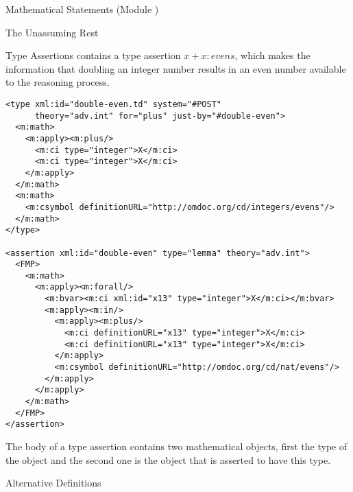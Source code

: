 \begin{tchapter}[id=statements,short=Mathematical Statements]{Mathematical Statements (Module {})}
\begin{tsection}[id=assertion]{The Unassuming Rest}
\begin{tsubsection}[id=type-assertions]{Type Assertions}
  {} contains a type assertion $x+x\colon evens$, which makes
  the information that doubling an integer number results in an even number available to
  the reasoning process.

\begin{lstlisting}[label=lst:term-declaration,
  caption={A Term declaration in {\omdoc}.},
  index={type,assertion}]
<type xml:id="double-even.td" system="#POST" 
      theory="adv.int" for="plus" just-by="#double-even">
  <m:math>
    <m:apply><m:plus/>
      <m:ci type="integer">X</m:ci>
      <m:ci type="integer">X</m:ci>
    </m:apply>
  </m:math>
  <m:math>
    <m:csymbol definitionURL="http://omdoc.org/cd/integers/evens"/>
  </m:math>
</type>

<assertion xml:id="double-even" type="lemma" theory="adv.int">
  <FMP>
    <m:math>
      <m:apply><m:forall/>
        <m:bvar><m:ci xml:id="x13" type="integer">X</m:ci></m:bvar>
        <m:apply><m:in/>
          <m:apply><m:plus/>
            <m:ci definitionURL="x13" type="integer">X</m:ci>
            <m:ci definitionURL="x13" type="integer">X</m:ci>
          </m:apply>
          <m:csymbol definitionURL="http://omdoc.org/cd/nat/evens"/>
        </m:apply>
      </m:apply>
    </m:math>
  </FMP>
</assertion>
\end{lstlisting}
The body of a type assertion contains two mathematical objects, first the type of
the object and the second one is the object that is asserted to have this
type.
\end{tsubsection}

\begin{tsubsection}[id=alternative]{Alternative Definitions}
  

\end{tsubsection}
\end{tsection}
\end{tchapter}
